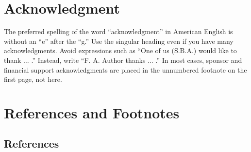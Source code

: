 \documentclass[journal,twoside,web]{ieeecolor}
\begin{document}
\appendices

\section*{Acknowledgment}
The preferred spelling of the word ``acknowledgment'' in American English is 
without an ``e'' after the ``g.'' Use the singular heading even if you have 
many acknowledgments. Avoid expressions such as ``One of us (S.B.A.) would 
like to thank $\ldots$ .'' Instead, write ``F. A. Author thanks $\ldots$ .'' In most 
cases, sponsor and financial support acknowledgments are placed in the 
unnumbered footnote on the first page, not here.

\section*{References and Footnotes}
\subsection{References}
% 

% 


\end{document}
